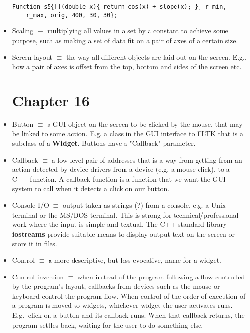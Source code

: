 \documentclass[12pt]{article}
\begin{document}
\begin{itemize}
\begin{lstlisting}
Function s5{[](double x){ return cos(x) + slope(x); }, r_min,
	r_max, orig, 400, 30, 30};
\end{lstlisting}

\item Scaling $\equiv$ multiplying all values in a set by a constant to achieve some purpose, such as making a set of data fit on a pair of axes of a certain size.

\item Screen layout $\equiv$ the way all different objects are laid out on the screen. E.g., how a pair of axes is offset from the top, bottom and sides of the screen etc.

\section*{Chapter 16}

\item Button $\equiv$ a GUI object on the screen to be clicked by the mouse, that may be linked to some action. E.g. a class in the GUI interface to FLTK that is a subclass of a \textbf{Widget}. Buttons have a "Callback" parameter.

\item Callback $\equiv$ a low-level pair of addresses that is a way from getting from an action detected by device drivers from a device (e.g. a mouse-click), to a C++ function. A callback function is a function that we want the GUI system to call when it detects a click on our button.

\item Console I/O $\equiv$ output taken as strings (?) from a console, e.g. a Unix terminal or the MS/DOS terminal. This is strong for technical/professional work where the input is simple and textual. The C++ standard library \textbf{iostreams} provide suitable means to display output text on the screen or store it in files.

\item Control $\equiv$ a more descriptive, but less evocative, name for a widget. 

\item Control inversion $\equiv$ when instead of the program following a flow controlled by the program's layout, callbacks from devices such as the mouse or keyboard control the program flow. When control of the order of execution of a program is moved to widgets, whichever widget the user activates runs. E.g., click on a button and its callback runs. When that callback returns, the program settles back, waiting for the user to do something else.


\end{itemize}
\end{document}
